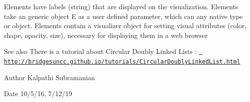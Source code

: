 Elements have labels (string) that are displayed on the visualization. Elements take an generic object E as a user defined parameter, which can any native type or object. Elements contain a visualizer object for setting visual attributes (color, shape, opacity, size), necessary for displaying them in a web browser

\begin{DoxySeeAlso}{See also}
There is a tutorial about Circular Doubly Linked Lists \+: \href{http://bridgesuncc.github.io/tutorials/CircularDoublyLinkedList.html}{\texttt{ http\+://bridgesuncc.\+github.\+io/tutorials/\+Circular\+Doubly\+Linked\+List.\+html}}
\end{DoxySeeAlso}
\begin{DoxyAuthor}{Author}
Kalpathi Subramanian 
\end{DoxyAuthor}
\begin{DoxyDate}{Date}
10/5/16, 7/12/19 
\end{DoxyDate}
